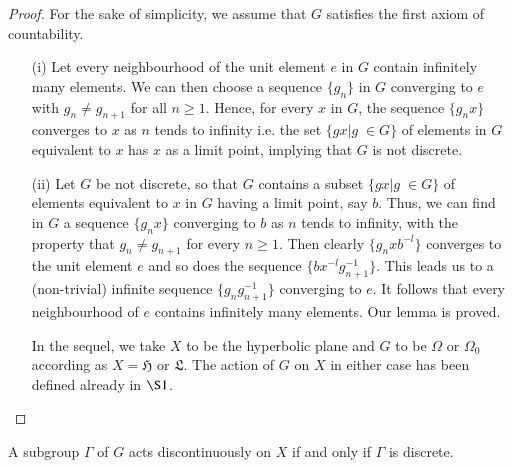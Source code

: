 \begin{proof}
For the sake of simplicity, we assume that $G$ satisfies the first
axiom of countability.
\begin{itemize}
\item[{\rm (i)}] Let every neighbourhood of the unit element $e$ in
  $G$ contain infinitely many elements. We can then choose a sequence
  $\{g_n\}$ in $G$ converging to $e$ with $g_n \neq g_{n+1}$ for all
  $n\geq 1$. Hence, for every $x$ in $G$, the sequence $\{g_n x\}$
  converges to $x$ as $n$ tends to infinity i.e. the set $\{gx
  |g \; \in G\}$ of elements in $G$ equivalent to $x$ has $x$ as a
  limit point, implying that $G$ is not discrete.

\item[{\rm (ii)}] Let $G$ be not discrete, so that $G$ contains a
  subset $\{gx |g \; \in G\}$ of elements equivalent to $x$ in $G$
  having a limit point, say $b$. Thus, we can find in $G$ a sequence
  $\{g_nx\}$ converging to $b$ as $n$ tends to infinity, with the
  property that $g_n \neq g_{n+1}$ for every $n\geq 1$. Then clearly
  $\{g_n x b^{-l}\}$ converges to the unit element $e$ and so does the
  sequence $\{bx^{-l}g^{-1}_{n+1}\}$. This leads us to a (non-trivial)
  infinite sequence $\{g_n g^{-1}_{n+1}\}$ converging to $e$. It
  follows that every neighbourhood of $e$ contains infinitely many
  elements. Our lemma is proved. 

In the sequel, we take $X$ to be the hyperbolic plane and $G$ to be
$\Omega$ or $\Omega_0$ according as $X = \mathfrak{H}$ or
$\mathfrak{L}$. The action of $G$ on $X$ in either case has been
defined already in $\S 1$.
\end{itemize}
\end{proof}

\begin{thm}
A subgroup $\Gamma$ of $G$ acts discontinuously on $X$ if and only if
$\Gamma$ is discrete.
\end{thm}

